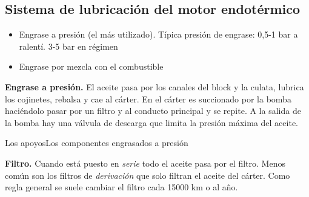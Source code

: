 \subsection{Sistema de lubricación del motor endotérmico}
\begin{itemize}
    \item Engrase a presión (el más utilizado). Típica presión de engrase: 0,5-1 bar a ralentí. 3-5 bar en régimen
    \item Engrase por mezcla con el combustible
\end{itemize}

{\bf Engrase a presión.} El aceite pasa por los canales del block y la culata, lubrica los cojinetes, rebalsa y cae al cárter. En el cárter es succionado por la bomba haciéndolo pasar por un filtro y al conducto principal y se repite. A la salida de la bomba hay una válvula de descarga que limita la presión máxima del aceite.

Los apoyosLos componentes engrasados a presión 

\textbf{Filtro.} Cuando está puesto en \textit{serie} todo el aceite pasa por el filtro. Menos común son los filtros de \textit{derivación} que solo filtran el aceite del cárter. Como regla general se suele cambiar el filtro cada 15000 km o al año.